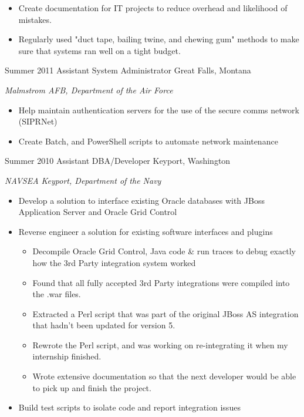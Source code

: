 \documentclass[]{two-column-stats} %
\begin{document}
\begin{entrylist}
{\begin{itemize}
\begin{itemize}
  \item Produced reports with varying levels of detail, dependant on the target audience.
\end{itemize}
\item Create documentation for IT projects to reduce overhead and likelihood of mistakes.
\item Regularly used "duct tape, bailing twine, and chewing gum" methods to make sure that systems ran well on a tight budget.
\end{itemize}
}
\entry
{Summer 2011}
{Assistant System Administrator}
{Great Falls, Montana}
{\emph{Malmstrom AFB, Department of the Air Force}
\begin{itemize}
\item Help maintain authentication servers for the use of the secure comms network (SIPRNet)
\item Create Batch, and PowerShell scripts to automate network maintenance
\end{itemize}
}
\entry
{Summer 2010}
{Assistant DBA/Developer}
{Keyport, Washington}
{\emph{NAVSEA Keyport, Department of the Navy}
\begin{itemize}
\item Develop a solution to interface existing Oracle databases with JBoss Application Server and Oracle Grid Control
\item Reverse engineer a solution for existing software interfaces and plugins
\begin{itemize}
  \item Decompile Oracle Grid Control, Java code & run traces to debug exactly how the 3rd Party integration system worked
  \item Found that all fully accepted 3rd Party integrations were compiled into the .war files.
  \item Extracted a Perl script that was part of the original JBoss AS integration that hadn't been updated for version 5.
  \item Rewrote the Perl script, and was working on re-integrating it when my internship finished.
  \item Wrote extensive documentation so that the next developer would be able to pick up and finish the project.
\end{itemize}
\item Build test scripts to isolate code and report integration issues
\end{itemize}
}
\end{entrylist}
\end{document}
